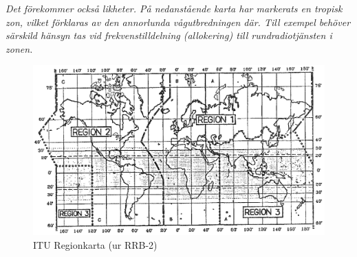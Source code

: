 \begin{multicols}{2}
\emph{Det förekommer också likheter.
  På nedanstående karta har markerats en tropisk zon, vilket förklaras av den
  annorlunda vågutbredningen där.
  Till exempel behöver särskild hänsyn tas vid frekvenstilldelning (allokering) till
  rundradiotjänsten i zonen.}

\begin{figure}
  \includegraphics[width=\textwidth]{images/cropped_pdfs/bild_3_2-01.pdf}
  \caption{ITU Regionkarta (ur RRB-2)}
  \label{fig:bildIII2-1}
\end{figure}

\end{multicols}
